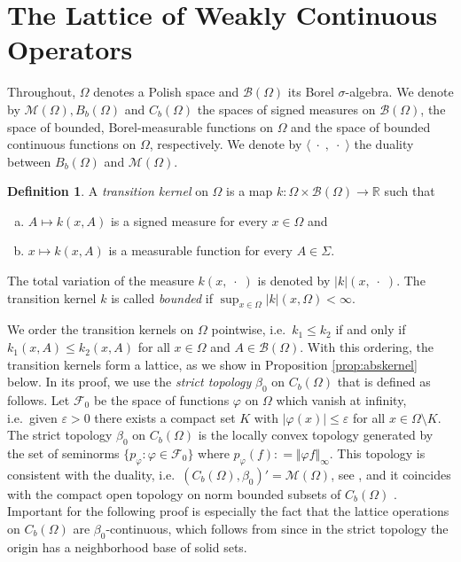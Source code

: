 \documentclass{amsart}
\numberwithin{equation}{section}
\theoremstyle{remark}
\theoremstyle{definition}
\newtheorem{defn}[thm]{Definition}
\begin{document}
\section{The Lattice of Weakly Continuous Operators}
\label{sec:lattice}
Throughout, $\Omega$ denotes a Polish space and $\mathscr{B}(\Omega)$ its  Borel $\sigma$-algebra.
We denote by $\mathscr{M}(\Omega), B_b(\Omega)$ and $C_b(\Omega)$ the spaces of signed measures on 
$\mathscr{B}(\Omega)$, the space of bounded, Borel-measurable functions on $\Omega$ and the space 
of bounded continuous functions on $\Omega$, respectively.
We denote by ${\langle {\; \cdot\;},{\; \cdot\;}\rangle}$ the duality between $B_b(\Omega)$ and $\mathscr{M}(\Omega)$.

\begin{defn}
\label{def:kernel}
	A \emph{transition kernel} on $\Omega$ is a map $k: \Omega\times\mathscr{B}(\Omega)\to {\mathds{R}}$ such that
	\begin{enumerate}[(a)]
	\item $A \mapsto k(x, A)$ is a signed measure for every $x\in \Omega$ and
	\item $x \mapsto k(x,A)$ is a measurable function for every $A\in \Sigma$.
	\end{enumerate}
	The total variation of the measure $k(x,\;\cdot\;)$ is denoted by $\lvert k \rvert(x,\;\cdot\;)$.
	The transition kernel $k$ is called \emph{bounded} if $\sup_{x\in \Omega} \lvert k\rvert (x, \Omega) <\infty$.
\end{defn}

We order the transition kernels on $\Omega$ pointwise, i.e.\ $k_1\leq k_2$ if and only if $k_1(x,A) \leq k_2(x,A)$ for 
all $x \in \Omega$ and $A \in \mathscr{B}(\Omega)$. With this ordering, the transition kernels form a lattice, as we show in Proposition \ref{prop:abskernel} below.
In its proof, we use the \emph{strict topology} $\beta_0$ on $C_b(\Omega)$ that is defined as follows. Let $\mathscr{F}_0$ be 
the space of functions $\varphi$ on $\Omega$ which vanish at infinity, i.e.\ given ${\varepsilon} > 0$ there exists a compact 
set $K$ with $\lvert \varphi (x)\rvert \leq {\varepsilon}$ for all $x \in \Omega\setminus K$. 
The strict topology $\beta_0$ on $C_b(\Omega)$ is the locally convex topology generated by the set of
seminorms $\{ p_\varphi : \varphi \in \mathscr{F}_0\}$ where $p_\varphi(f) {\mathrel{\mathop:}=} \Vert \varphi f\Vert_\infty$.
This topology is consistent with the duality, i.e.\ $(C_b(\Omega),\beta_0)'=\mathscr{M}(\Omega)$,
see \cite[Thm 7.6.3]{jarchow1981}, and
it coincides with the compact open topology on norm bounded subsets of $C_b(\Omega)$ \cite[Thm 2.10.4]{jarchow1981}.
Important for the following proof is especially the fact that the lattice operations on $C_b(\Omega)$ are $\beta_0$-continuous,
which follows from \cite[V 7.1]{schaefer1971} since in the strict topology the origin has a neighborhood base of solid sets.
\end{document}
